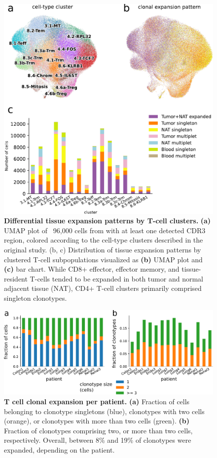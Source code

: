 \documentclass{article}
\begin{document}
\newpage
\begin{figure}[!ht]
  \centering
  \includegraphics[width=7in]{../figures/expansion_per_cluster.pdf}
  \caption{
    \textbf{Differential tissue expansion patterns by T-cell clusters.} 
    \textbf{(a)} UMAP plot of ~96,000 cells from \cite{Wu2020-vp} with at least one 
    detected CDR3 region, colored according to the cell-type clusters described in the 
    original study. (b, c) Distribution of tissue expansion patterns by clustered 
    T-cell subpopulations visualized as \textbf{(b)} UMAP plot and \textbf{(c)} bar
    chart. While CD8+ effector, effector memory, and tissue-resident T-cells tended 
    to be expanded in both tumor and normal adjacent tissue (NAT), CD4+ T-cell clusters
    primarily comprised singleton clonotypes.}
\end{figure}

\newpage
\begin{figure}[!ht]
  \centering
  \includegraphics[width=7in]{../figures/clonal_expansion.pdf}
  \caption{\textbf{T cell clonal expansion per patient.} \textbf{(a)} Fraction of cells belonging to clonotype singletons (blue), clonotypes with two cells (orange), or clonotypes with more than two cells (green). \textbf{(b)} Fraction of clonotypes comprising two, or more than two cells, respectively. Overall, between 8\% and 19\% of clonotypes were expanded, depending on the patient.}
\end{figure}
\end{document}

